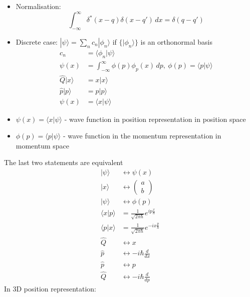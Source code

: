 \documentclass[a4paper,11pt,normalem]{article}
\begin{document}
\begin{itemize}
\item
  Normalisation:
\[
    \int_{-\infty}^{\infty} \delta^* (x-q)\delta(x-q')\,dx = \delta(q-q')
\]
\item Discrete case: \(|\psi\rangle = \sum_n c_n|\phi_n\rangle\) if
\(\{|\phi_n\rangle\}\) is an orthonormal basis
\[
    \begin{aligned}
    c_n &= \langle\phi_n|\psi\rangle \\
    \psi(x) &= \int_{-\infty}^{\infty} \phi(p)\phi_p(x)\,dp,~ \phi(p) = \langle p|\psi\rangle \\
    \hat{Q}|x\rangle &= x|x\rangle \\
    \hat{p}|p\rangle &= p|p\rangle \\
    \psi(x) &= \langle x|\psi\rangle
    \end{aligned}
\]
\item
  \(\psi(x) = \langle x|\psi\rangle\) - wave function in position
  representation in position space
\item
  \(\phi(p) = \langle p|\psi\rangle\) - wave function in the momentum
  representation in momentum space
\end{itemize}
The last two statements are equivalent
\[
    \begin{aligned}
    |\psi\rangle &\leftrightarrow \psi(x) \\
    |x\rangle &\leftrightarrow \begin{pmatrix} a \\ b \end{pmatrix} \\
    |\psi\rangle &\leftrightarrow \phi(p) \\
    \langle x|p\rangle &= \frac{1}{\sqrt{2\pi\hbar}}e^{ip\frac{x}{\hbar}} \\
    \langle p|x\rangle &= \frac{1}{\sqrt{2\pi\hbar}}e^{-ix\frac{p}{\hbar}} \\
    \hat{Q} &\leftrightarrow x \\
    \hat{p} &\leftrightarrow -i\hbar\frac{d}{dx} \\
    \hat{p} &\leftrightarrow p \\
    \hat{Q} &\leftrightarrow -i\hbar\frac{d}{dp}
    \end{aligned}
\]
In 3D position representation:
\end{document}
